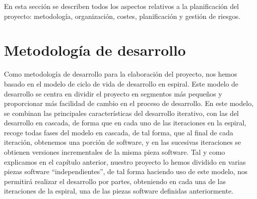 


En esta sección se describen todos los aspectos relativos a la planificación del
proyecto: metodología, organización, costes, planificación y gestión de riesgos.

\section{Metodología de desarrollo}

Como metodología de desarrollo para la elaboración del proyecto, nos hemos
basado en el modelo de ciclo de vida de desarrollo en espiral. Este modelo de
desarrollo se centra en dividir el proyecto en segmentos más pequeños y
proporcionar más facilidad de cambio en el proceso de desarrollo. En este
modelo, se combinan las principales características del desarrollo
iterativo, con las del desarrollo en cascada, de forma que en cada uno de las
iteraciones en la espiral, recoge todas fases del modelo en cascada, de
tal forma, que al final de cada iteración, obtenemos una porción de software,
y en las sucesivas iteraciones se obtienen versiones incrementales de la misma
pieza software. Tal y como explicamos en el capítulo anterior, nuestro proyecto
lo hemos dividido en varias piezas software ``independientes'', de tal forma
haciendo uso de este modelo, nos permitirá realizar el desarrollo por partes,
obteniendo en cada una de las iteraciones de la espiral, una de las piezas
software definidas anteriormente.

